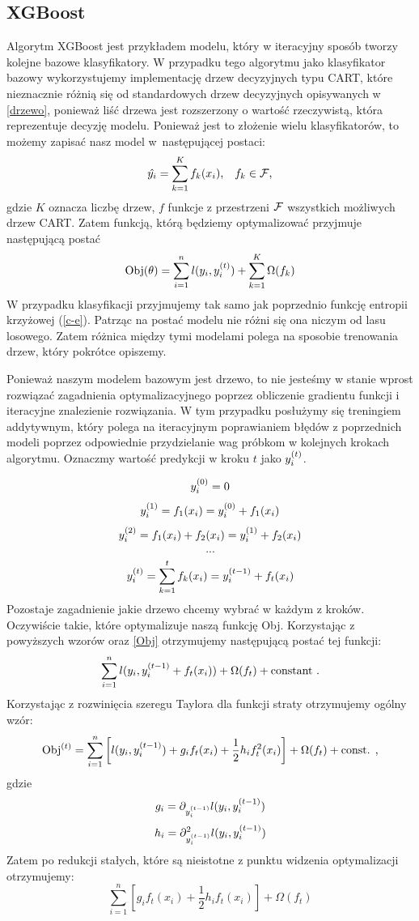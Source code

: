 \documentclass[inzynierska]{pwr_wmat_praca_dyplomowa}
\theoremstyle{plain}
\numberwithin{theorem}{chapter}
\theoremstyle{definition}
\numberwithin{theorem}{chapter}
\begin{document}
\subsection{XGBoost}
Algorytm XGBoost jest przykładem modelu, który w iteracyjny sposób tworzy kolejne bazowe klasyfikatory. W przypadku tego algorytmu jako klasyfikator bazowy wykorzystujemy implementację drzew decyzyjnych typu CART, które nieznacznie różnią się od standardowych drzew decyzyjnych opisywanych w \ref{drzewo}, ponieważ liść drzewa jest rozszerzony o wartość rzeczywistą, która reprezentuje decyzję modelu. Ponieważ jest to złożenie wielu klasyfikatorów, to możemy zapisać nasz model w~następującej postaci:
$$ \hat{y_i} = \sum_{k=1}^K f_k(x_i) \text{,} \quad f_k \in \mathcal{F} \text{,} $$
gdzie $K$ oznacza liczbę drzew, $f$ funkcje z przestrzeni $\mathcal{F}$ wszystkich możliwych drzew CART.
Zatem funkcją, którą będziemy optymalizować przyjmuje następującą postać
\begin{equation}
	\label{Obj}
	\text{Obj}(\theta) = \sum_{i=1}^{n} l(y_i, y_i^{(t)}) + \sum_{k=1}^{K} \Omega(f_k)
\end{equation}
W przypadku klasyfikacji przyjmujemy tak samo jak poprzednio funkcję entropii krzyżowej (\ref{c-e}).
Patrząc na postać modelu nie różni się ona niczym od lasu losowego. Zatem różnica między tymi modelami polega na sposobie trenowania drzew, który pokrótce opiszemy.

Ponieważ naszym modelem bazowym jest drzewo, to nie jesteśmy w stanie wprost rozwiązać zagadnienia optymalizacyjnego poprzez obliczenie gradientu funkcji i iteracyjne znalezienie rozwiązania. W tym przypadku posłużymy się treningiem addytywnym, który polega na iteracyjnym poprawianiem błędów z poprzednich modeli poprzez odpowiednie przydzielanie wag próbkom w kolejnych krokach algorytmu. 
Oznaczmy wartość predykcji w kroku $t$ jako $y_i^{(t)}$.

$$ y_i^{(0)} = 0 $$
$$ y_i^{(1)} = f_1(x_i)  = y_i^{(0)} + f_1(x_i) $$
$$ y_i^{(2)} = f_1(x_i) + f_2(x_i) = y_i^{(1)} + f_2(x_i) $$
$$ ... $$
$$ y_i^{(t)} = \sum_{k=1}^{t} f_k(x_i) = y_i^{(t-1)} + f_t(x_i) $$
Pozostaje zagadnienie jakie drzewo chcemy wybrać w każdym z kroków. Oczywiście takie, które optymalizuje naszą funkcję Obj. Korzystając z powyższych wzorów oraz \ref{Obj} otrzymujemy następującą postać tej funkcji:
$$ \sum_{i=1}^{n} l(y_i, y_i^{(t-1)} + f_t(x_i)) + \Omega(f_t) + \text{constant .}$$
Korzystając z rozwinięcia szeregu Taylora dla funkcji straty otrzymujemy ogólny wzór:
$$ \text{Obj}^{(t)} = \sum_{i=1}^{n} \left[ l(y_i, y_i^{(t-1)}) + g_i f_t(x_i) + \frac{1}{2} h_i f_t^2(x_i) \right] + \Omega(f_t) + \text{const. ,} $$
gdzie 
$$ g_i = \partial_{y_i^{(t-1)}} l(y_i, y_i^{(t-1)}) $$
$$ h_i = \partial^2_{y_i^{(t-1)}} l(y_i, y_i^{(t-1)}) $$
Zatem po redukcji stałych, które są nieistotne z punktu widzenia optymalizacji otrzymujemy:
$$ \sum_{i=1}^{n} [g_i f_t(x_i) + \frac{1}{2} h_i f_t(x_i)] + \Omega(f_t) $$
\end{document}
